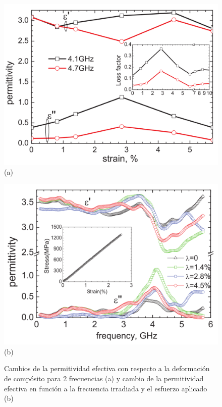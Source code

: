 \documentclass[12pt,letterpaper]{article}
\numberwithin{equation}{section}
\begin{document}
\begin{figure}[H]
	\begin{minipage}{0.5\linewidth}
		\centering\includegraphics[scale=0.23]{Imagenes/Permitividadvsdeformacion.png}\\
		\centering(a)
	\end{minipage}
	\begin{minipage}{0.5\linewidth}
		\centering\includegraphics[scale=0.23]{Imagenes/Permitividadesfuerzo.png}\\
		\centering(b)
	\end{minipage}
	\caption{Cambios de la permitividad efectiva con respecto a la deformación de compósito para 2 frecuencias (a) y cambio de la permitividad efectiva en función a la frecuencia irradiada y el esfuerzo aplicado (b)}
	\label{fig:Permitividad_esfuerzo}
\end{figure}
\end{document}
